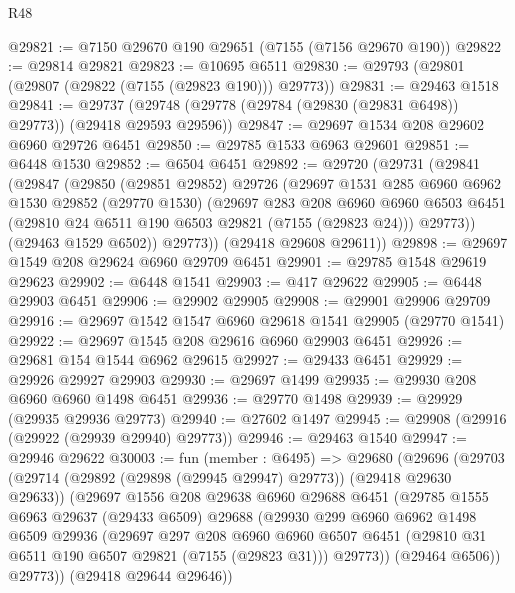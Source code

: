 \begin{lexlean}{R48}
\begin{coremodule}
@29821 := @7150 @29670 @190 @29651 (@7155 (@7156 @29670 @190))
@29822 := @29814 @29821
@29823 := @10695 @6511
@29830 := @29793 (@29801 (@29807 (@29822 (@7155 (@29823 @190))) @29773))
@29831 := @29463 @1518
@29841 := @29737 (@29748 (@29778 (@29784 (@29830 (@29831 @6498)) @29773)) (@29418 @29593 @29596))
@29847 := @29697 @1534 @208 @29602 @6960 @29726 @6451
@29850 := @29785 @1533 @6963 @29601
@29851 := @6448 @1530
@29852 := @6504 @6451
@29892 := @29720
    (@29731
      (@29841
        (@29847
          (@29850
            (@29851 @29852)
            @29726
            (@29697
              @1531
              @285
              @6960
              @6962
              @1530
              @29852
              (@29770 @1530)
              (@29697
                @283
                @208
                @6960
                @6960
                @6503
                @6451
                (@29810 @24 @6511 @190 @6503 @29821 (@7155 (@29823 @24)))
                @29773))
            (@29463 @1529 @6502))
          @29773))
      (@29418 @29608 @29611))
@29898 := @29697 @1549 @208 @29624 @6960 @29709 @6451
@29901 := @29785 @1548 @29619 @29623
@29902 := @6448 @1541
@29903 := @417 @29622
@29905 := @6448 @29903 @6451
@29906 := @29902 @29905
@29908 := @29901 @29906 @29709
@29916 := @29697 @1542 @1547 @6960 @29618 @1541 @29905 (@29770 @1541)
@29922 := @29697 @1545 @208 @29616 @6960 @29903 @6451
@29926 := @29681 @154 @1544 @6962 @29615
@29927 := @29433 @6451
@29929 := @29926 @29927 @29903
@29930 := @29697 @1499
@29935 := @29930 @208 @6960 @6960 @1498 @6451
@29936 := @29770 @1498
@29939 := @29929 (@29935 @29936 @29773)
@29940 := @27602 @1497
@29945 := @29908 (@29916 (@29922 (@29939 @29940) @29773))
@29946 := @29463 @1540
@29947 := @29946 @29622
@30003 := fun (member : @6495) =>
  @29680
    (@29696
      (@29703
        (@29714 (@29892 (@29898 (@29945 @29947) @29773)) (@29418 @29630 @29633))
        (@29697
          @1556
          @208
          @29638
          @6960
          @29688
          @6451
          (@29785
            @1555
            @6963
            @29637
            (@29433 @6509)
            @29688
            (@29930
              @299
              @6960
              @6962
              @1498
              @6509
              @29936
              (@29697
                @297
                @208
                @6960
                @6960
                @6507
                @6451
                (@29810 @31 @6511 @190 @6507 @29821 (@7155 (@29823 @31)))
                @29773))
            (@29464 @6506))
          @29773))
      (@29418 @29644 @29646))

\end{coremodule}
\end{lexlean}
